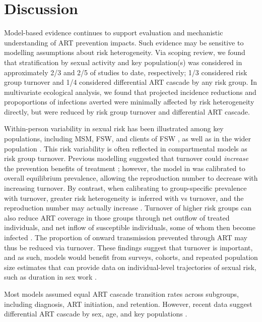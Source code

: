 \section{Discussion}
\label{s:disc}
Model-based evidence continues to support
evaluation and mechanistic understanding of ART prevention impacts.
Such evidence may be sensitive to modelling assumptions about risk heterogeneity.
Via scoping review, we found that stratification by sexual activity and key population(s)
was considered in approximately 2/3 and 2/5 of studies to date, respectively;
1/3 considered risk group turnover and 1/4 considered differential ART cascade by any risk group.
In multivariate ecological analysis, we found that
projected incidence reductions and propoportions of infections averted
were minimally affected by risk heterogeneity directly,
but were reduced by risk group turnover and differential ART cascade.
\par
Within-person variability in sexual risk has been illustrated among key populations,
including MSM, FSW, and clients of FSW \cite{Fazito2012,Romero-Severson2012,Roberts2020},
as well as in the wider population \cite{Houle2018}.
This risk variability is often reflected in compartmental models as risk group turnover.
Previous modelling suggested that
turnover could \emph{increase} the prevention benefits of treatment \cite{Henry2015};
however, the model in \cite{Henry2015} was calibrated to overall equilibrium prevalence,
allowing the reproduction number to decrease with increasing turnover.
By contrast, when calibrating to group-specific prevalence with turnover,
greater risk heterogeneity is inferred with vs turnover,
and the reproduction number may actually increase \cite{Knight2020}.
Turnover of higher risk groups can also reduce ART coverage in those groups through
net outflow of treated individuals, and net inflow of susceptible individuals,
some of whom then become infected \cite{Knight2020}.
The proportion of onward transmission prevented through ART may thus be reduced via turnover.
These findings suggest that turnover is important, and as such,
models would benefit from surveys, cohorts, and repeated population size estimates
that can provide data on individual-level trajectories of sexual risk,
such as duration in sex work \cite{Watts2010}.
\par
Most models assumed equal ART cascade transition rates across subgroups,
including diagnosis, ART initiation, and retention.
However, recent data suggest differential ART cascade by sex, age, and key populations
\cite{Lancaster2016,Stannah2019,Ma2020,Green2020}.
